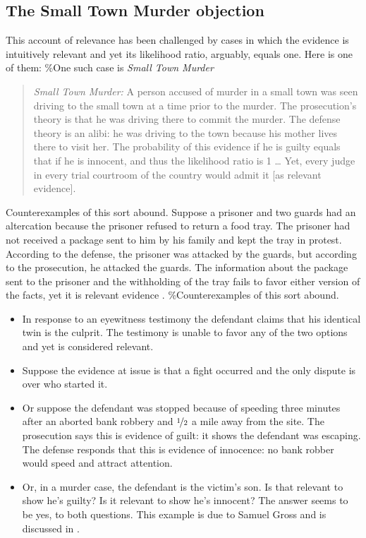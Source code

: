 \documentclass[10pt,dvipsnames,enabledeprecatedfontcommands]{scrartcl}
\begin{document}
\subsection{The Small Town Murder objection}

This account of relevance has been challenged by cases in which the
evidence is intuitively relevant and yet its likelihood ratio, arguably,
equals one. Here is one of them: \%One such case is
\emph{Small Town Murder}

\begin{quote}
    \emph{Small Town Murder:} A person accused of murder in a small town was seen driving to the small town at a time prior to the murder. The prosecution's theory is that he was driving there to commit the murder. The defense theory is an alibi: he was driving to the town because his mother lives there to visit her. The probability of this evidence if he is guilty equals that if he is innocent, and thus the likelihood ratio is 1 \dots %
    Yet, every judge in every trial courtroom of the country would admit it [as relevant evidence]. %
    \citep[The difficulty has been formulated by Ronald Allen, see the discussion in][]{park2010BayesWarsRedivivus}
    \end{quote}

\noindent  Counterexamples of this sort abound. Suppose a prisoner and
two guards had an altercation because the prisoner refused to return a
food tray. The prisoner had not received a package sent to him by his
family and kept the tray in protest. According to the defense, the
prisoner was attacked by the guards, but according to the prosecution,
he attacked the guards. The information about the package sent to the
prisoner and the withholding of the tray fails to favor either version
of the facts, yet it is relevant evidence
\citep{pardo2013NaturePurposeEvidence}. \%Counterexamples of this sort
abound.

\begin{itemize}
\item In response to an eyewitness testimony the defendant claims that his identical twin is the culprit. The testimony is unable to favor any of the two options and yet is considered relevant. 
\item  Suppose the evidence at issue is that a fight occurred and the only dispute is over who started it. 
\item  Or suppose the defendant was stopped because of speeding  three minutes after an aborted bank robbery and $\nicefrac{1}{2}$ a mile away from the site. The prosecution says this is evidence of guilt: it shows the defendant was escaping. The defense responds that this is evidence of innocence: no bank robber would speed and attract attention. 
\item Or, in a murder case, the defendant is the victim's son. Is that relevant to show he’s guilty? Is it relevant to show he's innocent? The answer seems to be yes, to both questions. 
This example is due to Samuel Gross 
and is discussed in \citep{park2010BayesWarsRedivivus}. 
\end{itemize}
\end{document}
